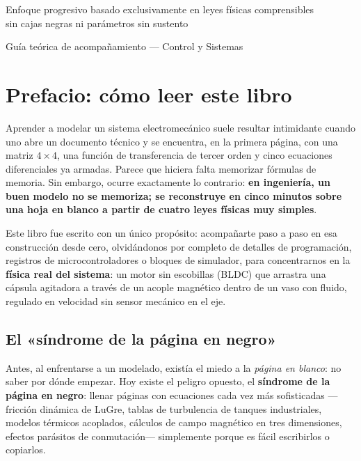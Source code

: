 \documentclass[11pt,a4paper,oneside]{book}
\begin{document}
\begin{titlepage}
  \vfill
  {\normalsize\color{mutedgray}
    Enfoque progresivo basado exclusivamente en leyes físicas comprensibles\\
    sin cajas negras ni parámetros sin sustento\par}
  \vspace{0.6cm}
  {\small\color{inkblue} Guía teórica de acompañamiento --- Control y Sistemas\par}
  \vspace*{0.6cm}
\end{titlepage}
\hypersetup{pageanchor=true}

\chapter*{Prefacio: cómo leer este libro}

Aprender a modelar un sistema electromecánico suele resultar intimidante cuando
uno abre un documento técnico y se encuentra, en la primera página, con una
matriz $4\times 4$, una función de transferencia de tercer orden y cinco
ecuaciones diferenciales ya armadas. Parece que hiciera falta memorizar fórmulas
de memoria. Sin embargo, ocurre exactamente lo contrario: \textbf{en ingeniería,
un buen modelo no se memoriza; se reconstruye en cinco minutos sobre una hoja en
blanco a partir de cuatro leyes físicas muy simples}.

Este libro fue escrito con un único propósito: acompañarte paso a paso en esa
construcción desde cero, olvidándonos por completo de detalles de programación,
registros de microcontroladores o bloques de simulador, para concentrarnos en
la \textbf{física real del sistema}: un motor sin escobillas (BLDC) que arrastra
una cápsula agitadora a través de un acople magnético dentro de un vaso con
fluido, regulado en velocidad sin sensor mecánico en el eje.

\section*{El «síndrome de la página en negro»}
Antes, al enfrentarse a un modelado, existía el miedo a la \emph{página en
blanco}: no saber por dónde empezar. Hoy existe el peligro opuesto, el
\textbf{síndrome de la página en negro}: llenar páginas con ecuaciones cada vez
más sofisticadas ---fricción dinámica de LuGre, tablas de turbulencia de tanques
industriales, modelos térmicos acoplados, cálculos de campo magnético en tres
dimensiones, efectos parásitos de conmutación--- simplemente porque es fácil
escribirlos o copiarlos.
\end{document}
